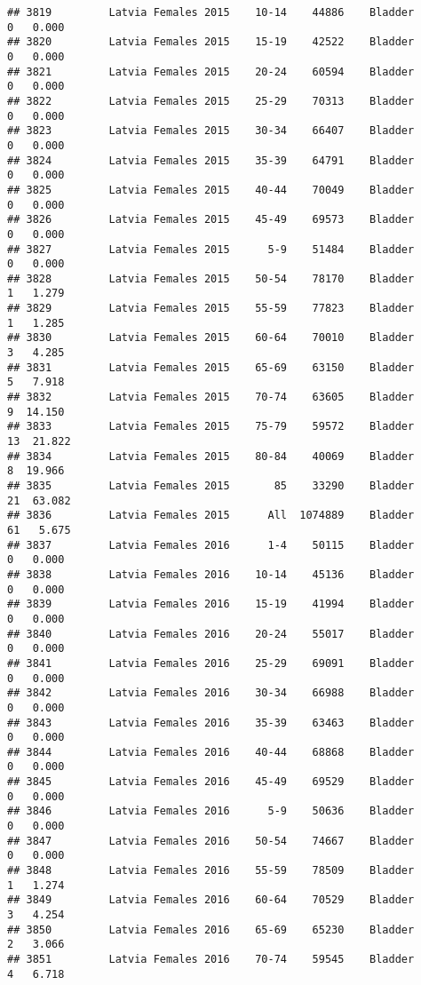\documentclass[
]{article}
\begin{document}
\begin{verbatim}
## 3819         Latvia Females 2015    10-14    44886    Bladder      0   0.000
## 3820         Latvia Females 2015    15-19    42522    Bladder      0   0.000
## 3821         Latvia Females 2015    20-24    60594    Bladder      0   0.000
## 3822         Latvia Females 2015    25-29    70313    Bladder      0   0.000
## 3823         Latvia Females 2015    30-34    66407    Bladder      0   0.000
## 3824         Latvia Females 2015    35-39    64791    Bladder      0   0.000
## 3825         Latvia Females 2015    40-44    70049    Bladder      0   0.000
## 3826         Latvia Females 2015    45-49    69573    Bladder      0   0.000
## 3827         Latvia Females 2015      5-9    51484    Bladder      0   0.000
## 3828         Latvia Females 2015    50-54    78170    Bladder      1   1.279
## 3829         Latvia Females 2015    55-59    77823    Bladder      1   1.285
## 3830         Latvia Females 2015    60-64    70010    Bladder      3   4.285
## 3831         Latvia Females 2015    65-69    63150    Bladder      5   7.918
## 3832         Latvia Females 2015    70-74    63605    Bladder      9  14.150
## 3833         Latvia Females 2015    75-79    59572    Bladder     13  21.822
## 3834         Latvia Females 2015    80-84    40069    Bladder      8  19.966
## 3835         Latvia Females 2015       85    33290    Bladder     21  63.082
## 3836         Latvia Females 2015      All  1074889    Bladder     61   5.675
## 3837         Latvia Females 2016      1-4    50115    Bladder      0   0.000
## 3838         Latvia Females 2016    10-14    45136    Bladder      0   0.000
## 3839         Latvia Females 2016    15-19    41994    Bladder      0   0.000
## 3840         Latvia Females 2016    20-24    55017    Bladder      0   0.000
## 3841         Latvia Females 2016    25-29    69091    Bladder      0   0.000
## 3842         Latvia Females 2016    30-34    66988    Bladder      0   0.000
## 3843         Latvia Females 2016    35-39    63463    Bladder      0   0.000
## 3844         Latvia Females 2016    40-44    68868    Bladder      0   0.000
## 3845         Latvia Females 2016    45-49    69529    Bladder      0   0.000
## 3846         Latvia Females 2016      5-9    50636    Bladder      0   0.000
## 3847         Latvia Females 2016    50-54    74667    Bladder      0   0.000
## 3848         Latvia Females 2016    55-59    78509    Bladder      1   1.274
## 3849         Latvia Females 2016    60-64    70529    Bladder      3   4.254
## 3850         Latvia Females 2016    65-69    65230    Bladder      2   3.066
## 3851         Latvia Females 2016    70-74    59545    Bladder      4   6.718

\end{verbatim}
\end{document}
